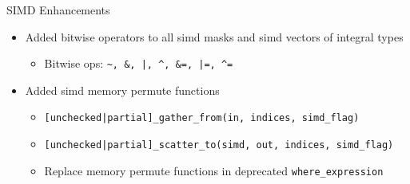 
\begin{frame}[fragile]{SIMD Enhancements}
  \begin{itemize}
    \item Added bitwise operators to all simd masks and simd vectors of integral types
    \begin{itemize}
      \item Bitwise ops: \texttt{\textasciitilde{}, \&{}, |, \^{}, \&=, |=, \^{}=}
    \end{itemize}

    \vspace{1em}

    \item Added simd memory permute functions
    \begin{itemize}
      \item \texttt{[unchecked|partial]\_gather\_from(in, indices, simd\_flag)}
      \item \texttt{[unchecked|partial]\_scatter\_to(simd, out, indices, simd\_flag)}
      \item Replace memory permute functions in deprecated \texttt{where\_expression}
    \end{itemize}
  \end{itemize}
\end{frame}


